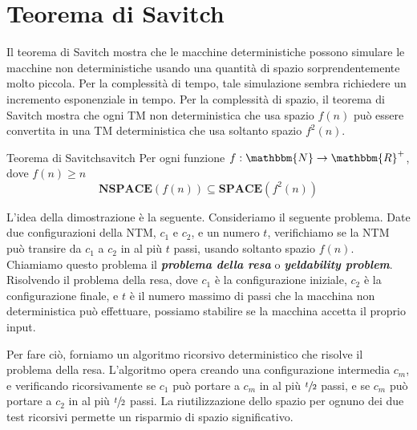 \documentclass[12pt]{report}
\newcounter{theorem}
\newcommand{\nmu}{}
\begin{document}
\section{Teorema di Savitch}
Il teorema di Savitch mostra che le macchine deterministiche possono simulare le macchine non deterministiche usando una quantità di spazio sorprendentemente molto piccola. Per la complessità di tempo, tale simulazione sembra richiedere un incremento esponenziale in tempo. Per la complessità di spazio, il teorema di Savitch mostra che ogni TM non deterministica che usa spazio $f(n)$ può essere convertita in una TM deterministica che usa soltanto spazio $f^2(n)$.
\begin{theorem}{\nmu Teorema di Savitch}{savitch}
	Per ogni funzione $f: \mathbbm{N} \to \mathbbm{R}^+$, dove $f(n) \geq n$
	\[
	\mathbf{NSPACE}(f(n)) \subseteq \mathbf{SPACE}\left(f^2(n)\right)
	\]
\end{theorem}
L'idea della dimostrazione è la seguente. Consideriamo il seguente problema. Date due configurazioni della NTM, $c_1$ e $c_2$, e un numero $t$, verifichiamo se la NTM può transire  da $c_1$ a $c_2$ in al più $t$ passi, usando soltanto spazio $f(n)$. Chiamiamo questo problema il \textbf{\textit{problema della resa}} o \textbf{\textit{yeldability problem}}. Risolvendo il problema della resa, dove $c_1$ è la configurazione iniziale, $c_2$ è la configurazione finale, e $t$ è il numero massimo di passi che la macchina non deterministica può effettuare, possiamo stabilire se la macchina accetta il proprio input.

Per fare ciò, forniamo un algoritmo ricorsivo deterministico che risolve il problema della resa. L'algoritmo opera creando una configurazione intermedia $c_m$, e verificando ricorsivamente se $c_1$ può portare a $c_m$ in al più $\sfrac{t}{2}$ passi, e se $c_m$ può portare a $c_2$ in al più $\sfrac{t}{2}$ passi. La riutilizzazione dello spazio per ognuno dei due test ricorsivi permette un risparmio di spazio significativo.
\end{document}
